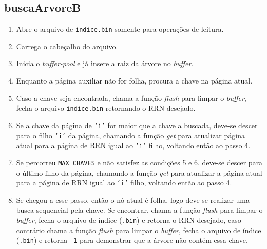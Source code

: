 \documentclass[
	12pt,				%
	openany,			%
	twoside,			%
	a4paper,			%
	english,			%
	french,				%
	spanish,			%
	brazil,				%
	]{abntex2}
\begin{document}
    \subsection{buscaArvoreB}
        \begin{enumerate}
            \item Abre o arquivo de \verb|indice.bin| somente para operações de leitura.
            \item Carrega o cabeçalho do arquivo.
            \item Inicia o \textit{buffer-pool} e já insere a raiz da árvore no \textit{buffer}.
            \item Enquanto a página auxiliar não for folha, procura a chave na página atual. 
            \item Caso a chave seja encontrada, chama a função \textit{flush} para limpar o \textit{buffer}, fecha o arquivo \verb|indice.bin| retornando o RRN desejado.
            \item Se a chave da página de \verb|‘i’| for maior que a chave a buscada, deve-se descer para o filho \verb|‘i’| da página, chamando a função \textit{get} para atualizar página atual para a página de RRN igual ao \verb|‘i’| filho, voltando então ao passo 4.
            \item Se percorreu \verb|MAX_CHAVES| e não satisfez as condições 5 e 6, deve-se descer para o último filho da página, chamando a função \textit{get} para atualizar a página atual para a página de RRN igual ao \verb|‘i’| filho, voltando então ao passo 4.
            \item Se chegou a esse passo, então o nó atual é folha, logo deve-se realizar uma busca sequencial pela chave. Se encontrar, chama a função \textit{flush} para limpar o \textit{buffer}, fecha o arquivo de índice (\verb|.bin|) e retorna o RRN desejado, caso contrário chama a função \textit{flush} para limpar o \textit{buffer}, fecha o arquivo de índice (\verb|.bin|) e retorna \verb|-1| para demonstrar que a árvore não contém essa chave.
        \end{enumerate}
\end{document}
